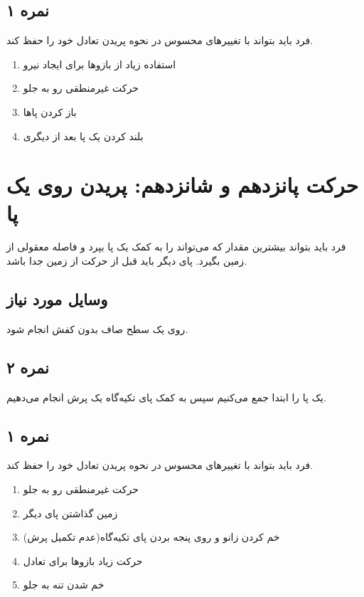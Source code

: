 \documentclass[12pt]{report}
\begin{document}
	\subsection*{نمره ۱}
	فرد باید بتواند با تغییر‌های محسوس در نحوه پریدن تعادل خود را حفظ کند.
	\begin{enumerate}
	\item استفاده زیاد از بازوها برای ایجاد نیرو
	\item حرکت غیرمنطقی رو به جلو
	\item باز کردن پاها
	\item بلند کردن یک پا بعد از دیگری
	\end{enumerate}
	\newpage
	
	\section*{حرکت پانزدهم و شانزدهم: پریدن روی یک پا}
	فرد باید بتواند بیشترین مقدار که می‌تواند را به کمک یک پا بپرد و فاصله معقولی از زمین بگیرد. پای دیگر باید قبل از حرکت از زمین جدا باشد.
	\subsection*{وسایل مورد نیاز}
	روی یک سطح صاف بدون کفش انجام شود.
	\subsection*{نمره ۲}
	یک پا را ابتدا جمع می‌کنیم سپس به کمک پای تکیه‌گاه یک پرش انجام می‌دهیم.
	\subsection*{نمره ۱}
	فرد باید بتواند با تغییر‌های محسوس در نحوه پریدن تعادل خود را حفظ کند.
	\begin{enumerate}
		\item حرکت غیرمنطقی رو به جلو
		\item زمین گذاشتن پای دیگر
		\item خم کردن زانو و روی پنجه بردن پای تکیه‌گاه(عدم تکمیل پرش)
		\item حرکت زیاد بازوها برای تعادل
		\item خم شدن تنه به جلو
	\end{enumerate}
	\newpage
	
\end{document}
